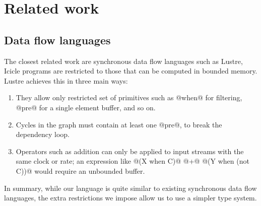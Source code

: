 \section{Related work}
\label{s:Related}
\subsection{Data flow languages}

The closest related work are synchronous data flow languages such as {\sc Lustre}, Icicle programs are restricted to those that can be computed in bounded memory.
{\sc Lustre}\cite{halbwachs1991synchronous} achieves this in three main ways:

\begin{enumerate}
\item They allow only restricted set of primitives such as @when@ for filtering, @pre@ for a single element buffer, and so on.
\item Cycles in the graph must contain at least one @pre@, to break the dependency loop.
\item Operators such as addition can only be applied to input streams with the same clock or rate; an expression like @(X when C)@ @+@ @(Y when (not C))@ would require an unbounded buffer.
\end{enumerate}

In summary, while our language is quite similar to existing synchronous data flow languages, the extra restrictions we impose allow us to use a simpler type system.

